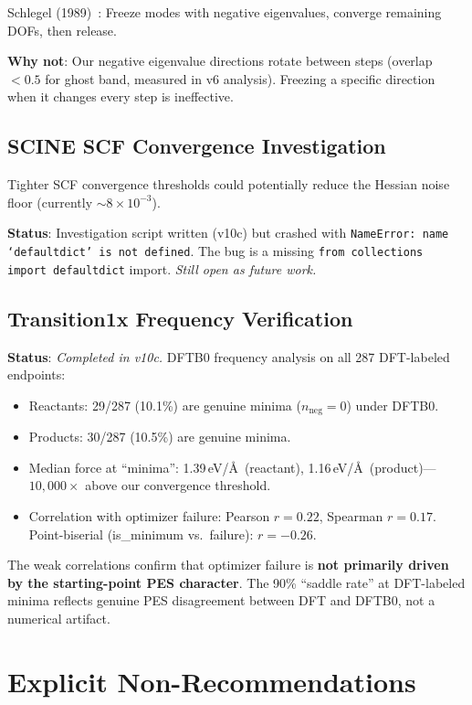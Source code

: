 \documentclass[11pt,a4paper]{article}
\theoremstyle{definition}
\begin{document}
Schlegel (1989)~\citep{schlegel1989}: Freeze modes with negative eigenvalues,
converge remaining DOFs, then release.

\textbf{Why not}: Our negative eigenvalue directions rotate between steps
(overlap $< 0.5$ for ghost band, measured in v6 analysis).  Freezing a
specific direction when it changes every step is ineffective.

\subsection{SCINE SCF Convergence Investigation}

Tighter SCF convergence thresholds could potentially reduce the Hessian noise
floor (currently $\sim8\times10^{-3}$).

\textbf{Status}: Investigation script written (v10c) but crashed with
\texttt{NameError: name `defaultdict' is not defined}.  The bug is a
missing \texttt{from collections import defaultdict} import.
\emph{Still open as future work.}

\subsection{Transition1x Frequency Verification}

\textbf{Status}: \emph{Completed in v10c.}  DFTB0 frequency analysis on
all 287 DFT-labeled endpoints:
\begin{itemize}[nosep]
  \item Reactants: 29/287 (10.1\%) are genuine minima ($n_\text{neg}=0$)
    under DFTB0.
  \item Products: 30/287 (10.5\%) are genuine minima.
  \item Median force at ``minima'': 1.39\,eV/\AA\ (reactant), 1.16\,eV/\AA\
    (product)---$10{,}000\times$ above our convergence threshold.
  \item Correlation with optimizer failure: Pearson $r=0.22$, Spearman
    $r=0.17$.  Point-biserial (is\_minimum vs.\ failure): $r=-0.26$.
\end{itemize}
The weak correlations confirm that optimizer failure is \textbf{not primarily
driven by the starting-point PES character}.  The 90\% ``saddle rate'' at
DFT-labeled minima reflects genuine PES disagreement between DFT and DFTB0,
not a numerical artifact.

\section{Explicit Non-Recommendations}
\label{sec:non-recommendations}
\end{document}
